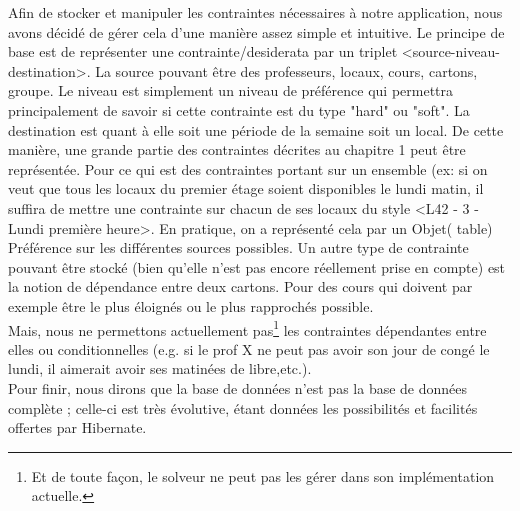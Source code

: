 \newline
\indent
Afin de stocker et manipuler les contraintes nécessaires à notre application, nous avons décidé de gérer cela d'une manière assez simple et intuitive. 
Le principe de base est de représenter une contrainte/desiderata par un triplet <source-niveau-destination>.  
\newline
\indent
La source pouvant être des professeurs, locaux, cours, cartons, groupe. Le niveau est simplement un niveau de préférence qui permettra principalement de savoir si cette contrainte est du type "hard" ou "soft".  La destination est quant à elle soit une période de la semaine soit un local.  De cette manière, une grande partie des contraintes décrites au chapitre 1 peut être représentée.
\newline
\indent
    Pour ce qui est des contraintes portant sur un ensemble (ex: si on veut que tous les locaux du premier étage soient disponibles le lundi matin, il suffira de mettre une contrainte sur chacun de ses locaux du style <L42 - 3 - Lundi première heure>.  En pratique, on a représenté cela par un Objet( table) Préférence sur les différentes sources possibles.
   \newline
   \indent
Un autre type de contrainte pouvant être stocké (bien qu'elle n'est pas encore réellement prise en compte) est la notion de dépendance entre deux cartons.  Pour des cours qui doivent par exemple être le plus éloignés ou le plus rapprochés possible.\\
\newline
\indent
Mais, nous ne permettons actuellement pas\footnote{Et de toute façon, le solveur ne peut pas les gérer dans son implémentation actuelle.} les contraintes dépendantes entre elles ou conditionnelles (e.g. si le prof X ne peut pas avoir son jour de congé le lundi, il aimerait avoir ses matinées de libre,etc.).\\
\newline
\indent
Pour finir, nous dirons que la base de données n'est pas la base de données complète ; celle-ci est très évolutive, étant données les possibilités et facilités offertes par Hibernate.